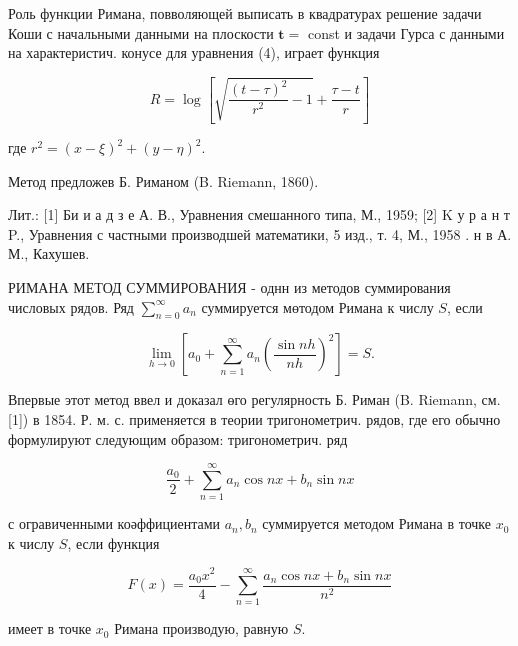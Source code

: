 \documentclass[10pt]{article}
\begin{document}
Роль функции Римана, повволяющей выписать в квадратурах решение задачи Коши с начальными данными на плоскости $\boldsymbol{t}=$ const и задачи Гурса с данными на характеристич. конусе для уравнения (4), играет функция



\[

R=\log \left[\sqrt{\frac{(t-\tau)^{2}}{r^{2}}-1}+\frac{\tau-t}{r}\right]

\]



где $r^{2}=(x-\xi)^{2}+(y-\eta)^{2}$.



Метод предложев Б. Риманом (B. Riemann, 1860).



Лит.: [1] Би и а д з е А. В., Уравнения смешанного типа, М., 1959; [2] K у р а н т P., Уравнения с частными производшей математики, 5 изд., т. 4, М., 1958 . н в А. М., Кахушев.



РИМАНА МЕТОД СУММИРОВАНИЯ - однн из методов суммирования числовых рядов. Ряд $\sum_{n=0}^{\infty} a_{n}$ суммируется мөтодом Римана к числу $S$, если



\[

\lim _{h \rightarrow 0}\left[a_{0}+\sum_{n=1}^{\infty} a_{n}\left(\frac{\sin n h}{n h}\right)^{2}\right]=S .

\]



Впервые этот метод ввел и доказал өго регулярность Б. Риман (B. Riemann, см. [1]) в 1854. Р. м. с. применяется в теории тригонометрич. рядов, где его обычно формулируют следующим образом: тригонометрич. ряд



\[

\frac{a_{0}}{2}+\sum_{n=1}^{\infty} a_{n} \cos n x+b_{n} \sin n x

\]



с огравиченными коәффициентами $a_{n}, b_{n}$ суммируется методом Римана в точке $x_{0}$ к числу $S$, если функция



\[

F(x)=\frac{a_{0} x^{2}}{4}-\sum_{n=1}^{\infty} \frac{a_{n} \cos n x+b_{n} \sin n x}{n^{2}}

\]



имеет в точке $x_{0}$ Римана производую, равную $S$.
\end{document}
